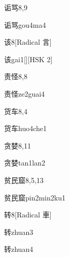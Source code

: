 \begin{entry}{诟骂}{8,9}
  \begin{phonetics}{诟骂}{gou4ma4}
  \end{phonetics}
\end{entry}

\begin{entry}{该}{8}[Radical 言]
  \begin{phonetics}{该}{gai1}[][HSK 2]
  \end{phonetics}
\end{entry}

\begin{entry}{责怪}{8,8}
  \begin{phonetics}{责怪}{ze2guai4}
  \end{phonetics}
\end{entry}

\begin{entry}{货车}{8,4}
  \begin{phonetics}{货车}{huo4che1}
  \end{phonetics}
\end{entry}

\begin{entry}{贪婪}{8,11}
  \begin{phonetics}{贪婪}{tan1lan2}
  \end{phonetics}
\end{entry}

\begin{entry}{贫民窟}{8,5,13}
  \begin{phonetics}{贫民窟}{pin2min2ku1}
  \end{phonetics}
\end{entry}

\begin{entry}{转}{8}[Radical 車]
  \begin{phonetics}{转}{zhuan3}
  \end{phonetics}
  \begin{phonetics}{转}{zhuan4}
  \end{phonetics}
\end{entry}

